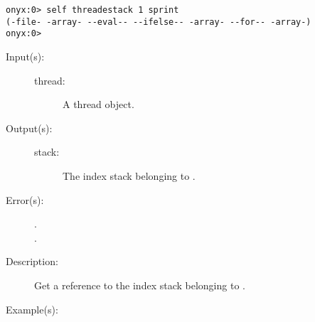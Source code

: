 \begin{description}
\begin{description}
\begin{verbatim}
onyx:0> self threadestack 1 sprint
(-file- -array- --eval-- --ifelse-- -array- --for-- -array-)
onyx:0>
		\end{verbatim}
	\end{description}
\label{systemdict:threadistack}
\item[{\onyxop{thread}{threadistack}{stack}}: ]
	\begin{description}\item[]
	\item[Input(s): ]
		\begin{description}\item[]
		\item[thread: ]
			A thread object.
		\end{description}
	\item[Output(s): ]
		\begin{description}\item[]
		\item[stack: ]
			The index stack belonging to .
		\end{description}
	\item[Error(s): ]
		\begin{description}\item[]
		\item[.]
		\item[.]
		\end{description}
	\item[Description: ]
		Get a reference to the index stack belonging to .
	\item[Example(s): ]\begin{verbatim}


\end{verbatim}
\end{description}
\end{description}
